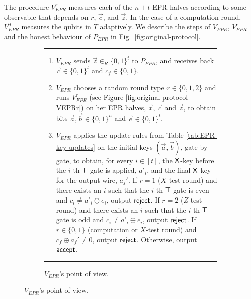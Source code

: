 The procedure $V_{EPR}^r$ measures each of the $n+t$ EPR halves according to
some observable that depends on $r$, $\vec{c}$, and $\vec{z}$. In the case of a
computation round, $V_{EPR}^0$ measures the qubits in $T$ adaptively.  We
describe the steps of $V_{EPR}$, $V_{EPR}^r$ and the honest behaviour of
$P_{EPR}$ in Fig.~\ref{fig:original-protocol}.


\begin{figure}[H]
  \begin{subfigure}{\textwidth}
\rule[1ex]{\textwidth}{0.5pt}
\begin{enumerate}
\item $V_{EPR}$ sends $\vec{z}\in_R\{0,1\}^t$ to $P_{EPR}$,
and receives back $\vec{c}\in\{0,1\}^t$ and $c_f\in\{0,1\}$.
\item $V_{EPR}$ chooses a random round type $r\in\{0,1,2\}$ and runs $V_{EPR}^r$ (see Figure \ref{fig:original-protocol-VEPRr}) on her EPR halves, $\vec{x}$, $\vec{c}$ and $\vec{z}$, to obtain bits $\vec{a},\vec{b}\in\{0,1\}^n$ and $\vec{e}\in\{0,1\}^t$. 
\item $V_{EPR}$ applies the update rules from Table \ref{tab:EPR-key-updates} on the initial keys $(\vec{a},\vec{b})$, gate-by-gate, to obtain, for every $i\in [t]$, the $\sf X$-key before the $i$-th $\sf T$ gate is applied, $a'_i$, and the final $\sf X$ key for the output wire, $a_f'$. If $r=1$ ($X$-test round) and there exists an $i$ such that the $i$-th $\sf T$ gate is even and $c_i\neq a'_i\oplus e_i$, output $\sf reject$. If $r=2$ ($Z$-test round) and there exists an $i$ such that the $i$-th $\sf T$ gate is odd and $c_i\neq a'_i\oplus e_i$, output $\sf reject$. If $r\in\{0,1\}$ (computation or $X$-test round) and $c_f\oplus a_f'\neq 0$, output $\sf reject$. Otherwise, output $\sf accept$. 
\end{enumerate}
\rule[2ex]{\textwidth}{0.5pt}\vspace{-.5cm}
    \caption{ $V_{EPR}$'s point of view.}
  \label{fig:original-protocol-VEPR}
    \end{subfigure}


\end{figure}
